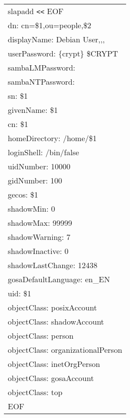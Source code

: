 \begin{center}
\begin{longtable}{|l|}
slapadd \verb|<<| EOF\\
dn: cn=\$1,ou=people,\$2\\
displayName: Debian User,,,\\
userPassword: \{crypt\} \$CRYPT\\
sambaLMPassword: \\
sambaNTPassword: \\
sn: \$1\\
givenName: \$1\\
cn: \$1\\
homeDirectory: /home/\$1\\
loginShell: /bin/false\\
uidNumber: 10000\\
gidNumber: 100\\
gecos: \$1\\
shadowMin: 0\\
shadowMax: 99999\\
shadowWarning: 7\\
shadowInactive: 0\\
shadowLastChange: 12438\\
gosaDefaultLanguage: en\_EN\\
uid: \$1\\
objectClass: posixAccount\\
objectClass: shadowAccount\\
objectClass: person\\
objectClass: organizationalPerson\\
objectClass: inetOrgPerson\\
objectClass: gosaAccount\\
objectClass: top\\
EOF\\
\end{longtable}
\end{center}


